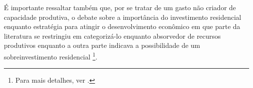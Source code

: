 É importante ressaltar também que, por se tratar de um gasto não criador de capacidade produtiva, o debate sobre a importância do investimento residencial enquanto estratégia para atingir o desenvolvimento econômico em que parte da literatura se restringiu em categorizá-lo enquanto absorvedor de recursos produtivos \cite{solow_importance_1995} enquanto a outra parte indicava  a possibilidade de um sobreinvestimento residencial \cite{mills_has_1987}\footnote{Para mais detalhes, ver \textcite{arku_housing_2006}.}.

